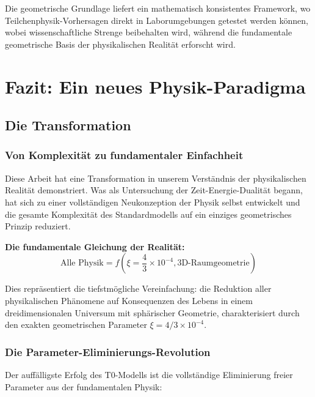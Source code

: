 \documentclass[12pt,a4paper]{report}
\begin{document}
	Die geometrische Grundlage liefert ein mathematisch konsistentes Framework, wo Teilchenphysik-Vorhersagen direkt in Laborumgebungen getestet werden können, wobei wissenschaftliche Strenge beibehalten wird, während die fundamentale geometrische Basis der physikalischen Realität erforscht wird.
	
	\chapter{Fazit: Ein neues Physik-Paradigma}
	\label{chap:conclusion}
	
	\section{Die Transformation}
	\label{sec:revolutionary_transformation}
	
	\subsection{Von Komplexität zu fundamentaler Einfachheit}
	\label{subsec:complexity_to_simplicity}
	
	Diese Arbeit hat eine Transformation in unserem Verständnis der physikalischen Realität demonstriert. Was als Untersuchung der Zeit-Energie-Dualität begann, hat sich zu einer vollständigen Neukonzeption der Physik selbst entwickelt und die gesamte Komplexität des Standardmodells auf ein einziges geometrisches Prinzip reduziert.
	
	\textbf{Die fundamentale Gleichung der Realität:}
	\begin{equation}
		\boxed{\text{Alle Physik} = f\left(\xi = \frac{4}{3} \times 10^{-4}, \text{3D-Raumgeometrie}\right)}
	\end{equation}
	
	Dies repräsentiert die tiefstmögliche Vereinfachung: die Reduktion aller physikalischen Phänomene auf Konsequenzen des Lebens in einem dreidimensionalen Universum mit sphärischer Geometrie, charakterisiert durch den exakten geometrischen Parameter $\xi = 4/3 \times 10^{-4}$.
	
	\subsection{Die Parameter-Eliminierungs-Revolution}
	\label{subsec:parameter_elimination}
	
	Der auffälligste Erfolg des T0-Modells ist die vollständige Eliminierung freier Parameter aus der fundamentalen Physik:
	
\end{document}
